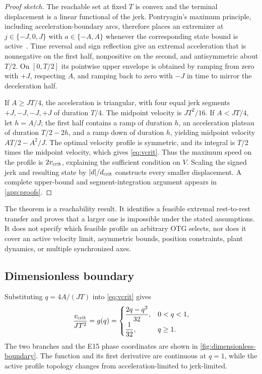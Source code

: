\begin{proof}[Proof sketch]
The reachable set at fixed $T$ is convex and the terminal displacement is a linear functional of the jerk. Pontryagin's maximum principle, including acceleration-boundary arcs, therefore places an extremizer at $j\in\{-J,0,J\}$ with $a\in\{-A,A\}$ whenever the corresponding state bound is active~\cite{pontryagin1962maximum}. Time reversal and sign reflection give an extremal acceleration that is nonnegative on the first half, nonpositive on the second, and antisymmetric about $T/2$. On $[0,T/2]$ its pointwise upper envelope is obtained by ramping from zero with $+J$, respecting $A$, and ramping back to zero with $-J$ in time to mirror the deceleration half.

If $A\ge JT/4$, the acceleration is triangular, with four equal jerk segments $+J,-J,-J,+J$ of duration $T/4$. The midpoint velocity is $JT^2/16$. If $A<JT/4$, let $h=A/J$; the first half contains a ramp of duration $h$, an acceleration plateau of duration $T/2-2h$, and a ramp down of duration $h$, yielding midpoint velocity $AT/2-A^2/J$. The optimal velocity profile is symmetric, and its integral is $T/2$ times the midpoint velocity, which gives \cref{eq:vcrit}. Thus the maximum speed on the profile is $2v_{\mathrm{crit}}$, explaining the sufficient condition on $V$. Scaling the signed jerk and resulting state by $\lvert d\rvert/d_{\mathrm{crit}}$ constructs every smaller displacement. A complete upper-bound and segment-integration argument appears in \cref{app:proofs}.
\end{proof}

The theorem is a reachability result. It identifies a feasible extremal rest-to-rest transfer and proves that a larger one is impossible under the stated assumptions. It does not specify which feasible profile an arbitrary OTG selects, nor does it cover an active velocity limit, asymmetric bounds, position constraints, plant dynamics, or multiple synchronized axes.

\subsection{Dimensionless boundary}

Substituting $q=4A/(JT)$ into \cref{eq:vcrit} gives
\begin{equation}
 \frac{v_{\mathrm{crit}}}{JT^2}=g(q)=
 \begin{cases}
 \dfrac{2q-q^2}{32}, & 0<q<1,\\[4pt]
 \dfrac{1}{32}, & q\ge1.
 \end{cases}
 \label{eq:gq}
\end{equation}
The two branches and the E15 phase coordinates are shown in \cref{fig:dimensionless-boundary}. The function and its first derivative are continuous at $q=1$, while the active profile topology changes from acceleration-limited to jerk-limited.


